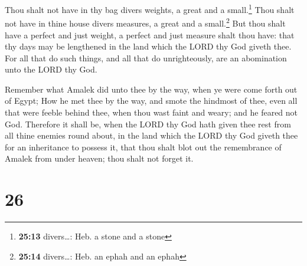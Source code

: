  Thou shalt not have in thy bag divers weights, a great
and a small.\footnote{\textbf{25:13} divers\ldots: Heb. a stone and a
  stone}  Thou shalt not have in thine house divers
measures, a great and a small.\footnote{\textbf{25:14} divers\ldots:
  Heb. an ephah and an ephah}  But thou shalt have a
perfect and just weight, a perfect and just measure shalt thou have:
that thy days may be lengthened in the land which the LORD thy God
giveth thee.  For all that do such things, and all that
do unrighteously, are an abomination unto the LORD thy God.

 Remember what Amalek did unto thee by the way, when ye
were come forth out of Egypt;  How he met thee by the
way, and smote the hindmost of thee, even all that were feeble behind
thee, when thou wast faint and weary; and he feared not God.
 Therefore it shall be, when the LORD thy God hath given
thee rest from all thine enemies round about, in the land which the LORD
thy God giveth thee for an inheritance to possess it, that thou shalt
blot out the remembrance of Amalek from under heaven; thou shalt not
forget it.

\hypertarget{section-25}{%
\section{26}\label{section-25}}

